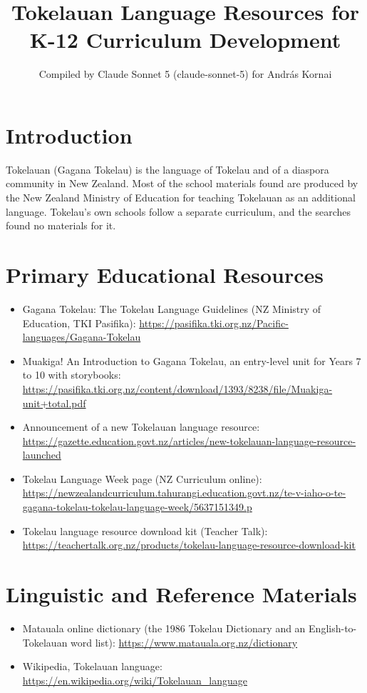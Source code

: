 \documentclass[12pt]{article}
\title{Tokelauan Language Resources for K-12 Curriculum Development}
\author{Compiled by Claude Sonnet 5 (claude-sonnet-5) for Andr\'as Kornai}
\date{}
\begin{document}
\maketitle

\section{Introduction}
Tokelauan (Gagana Tokelau) is the language of Tokelau and of a diaspora community in New Zealand. Most of the school materials found are produced by the New Zealand Ministry of Education for teaching Tokelauan as an additional language. Tokelau's own schools follow a separate curriculum, and the searches found no materials for it.

\section{Primary Educational Resources}
\begin{itemize}
\item Gagana Tokelau: The Tokelau Language Guidelines (NZ Ministry of Education, TKI Pasifika): \url{https://pasifika.tki.org.nz/Pacific-languages/Gagana-Tokelau}
\item Muakiga! An Introduction to Gagana Tokelau, an entry-level unit for Years 7 to 10 with storybooks: \url{https://pasifika.tki.org.nz/content/download/1393/8238/file/Muakiga-unit+total.pdf}
\item Announcement of a new Tokelauan language resource: \url{https://gazette.education.govt.nz/articles/new-tokelauan-language-resource-launched}
\item Tokelau Language Week page (NZ Curriculum online): \url{https://newzealandcurriculum.tahurangi.education.govt.nz/te-v-iaho-o-te-gagana-tokelau-tokelau-language-week/5637151349.p}
\item Tokelau language resource download kit (Teacher Talk): \url{https://teachertalk.org.nz/products/tokelau-language-resource-download-kit}
\end{itemize}

\section{Linguistic and Reference Materials}
\begin{itemize}
\item Matauala online dictionary (the 1986 Tokelau Dictionary and an English-to-Tokelauan word list): \url{https://www.matauala.org.nz/dictionary}
\item Wikipedia, Tokelauan language: \url{https://en.wikipedia.org/wiki/Tokelauan_language}
\end{itemize}
\end{document}
